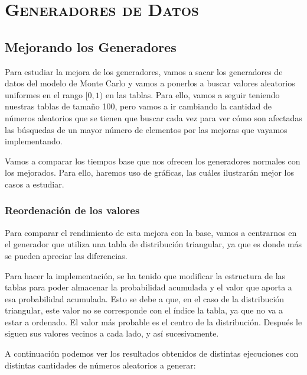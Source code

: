 \documentclass[11pt,a4paper]{report}
\begin{document}
\newpage

\chapter{\textsc{Generadores de Datos}}

\section{Mejorando los Generadores}

Para estudiar la mejora de los generadores, vamos a sacar los generadores de datos del modelo de Monte Carlo y vamos a ponerlos
a buscar valores aleatorios uniformes en el rango $[0, 1)$ en las tablas. Para ello, vamos a seguir teniendo nuestras
tablas de tamaño 100, pero vamos a ir cambiando la cantidad de números aleatorios que se tienen que buscar cada vez
para ver cómo son afectadas las búsquedas de un mayor número de elementos por las mejoras que vayamos implementando.

Vamos a comparar los tiempos base que nos ofrecen los generadores normales con los mejorados. Para ello, haremos uso de gráficas,
las cuáles ilustrarán mejor los casos a estudiar.

\subsection{Reordenación de los valores}

Para comparar el rendimiento de esta mejora con la base, vamos a centrarnos en el generador que utiliza una tabla de distribución
triangular, ya que es donde más se pueden apreciar las diferencias.

Para hacer la implementación, se ha tenido que modificar la estructura de las tablas para poder almacenar la probabilidad acumulada
y el valor que aporta a esa probabilidad acumulada. Esto se debe a que, en el caso de la distribución triangular, este valor no
se corresponde con el índice la tabla, ya que no va a estar a ordenado. El valor más probable es el centro de la distribución.
Después le siguen sus valores vecinos a cada lado, y así sucesivamente.

A continuación podemos ver los resultados obtenidos de distintas ejecuciones con distintas cantidades de números aleatorios a
generar:
\end{document}
